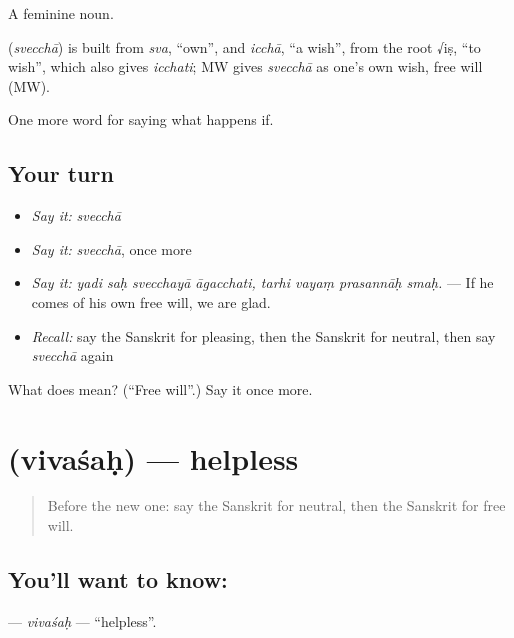 A feminine noun.

\begin{cousinweb}
\textbf{} (\emph{svecchā}) is built from \emph{sva}, \textquotedblleft{}own\textquotedblright{}, and \emph{icchā}, \textquotedblleft{}a wish\textquotedblright{}, from the root √iṣ, \textquotedblleft{}to wish\textquotedblright{}, which also gives \emph{icchati}; MW gives \emph{svecchā} as one's own wish, free will (MW).
\end{cousinweb}

\begin{grammarlens}[title={What you've built}]
One more word for saying what happens if.
\end{grammarlens}

\subsection*{Your turn}
\begin{itemize}
\raggedright
  \item \emph{Say it:} \emph{svecchā}
  \item \emph{Say it:} \emph{svecchā}, once more
  \item \emph{Say it:} \emph{yadi saḥ svecchayā āgacchati, tarhi vayaṃ prasannāḥ smaḥ.} — If he comes of his own free will, we are glad.
  \item \emph{Recall:} say the Sanskrit for pleasing, then the Sanskrit for neutral, then say \emph{svecchā} again
\end{itemize}

\begin{tcolorbox}[breakable,colback=teal!4,colframe=teal!35!black,title={Before you move on}]
What does  mean? (\textquotedblleft{}Free will\textquotedblright{}.) Say it once more.
\end{tcolorbox}
\section[\texorpdfstring{\sk{विवशः} (vivaśaḥ)}{विवशः (vivaśaḥ)}]{ (vivaśaḥ) — helpless}

\label{lesson:SA-C543-vivasah}



\begin{quote}
Before the new one: say the Sanskrit for neutral, then the Sanskrit for free will.
\end{quote}

\subsection*{You'll want to know: }
\textbf{} — \emph{vivaśaḥ} — \textquotedblleft{}helpless\textquotedblright{}.

